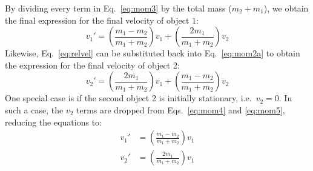 By dividing every term in Eq.~\ref{eq:mom3} by the total mass ($m_2+m_1$), we 
obtain the final expression for the final velocity of object $1$:
\begin{equation}
  \boxed{
    v_1'=
    \left(\frac{m_1-m_2}{m_1+m_2}\right)v_1 +
    \left(\frac{2m_1}{m_1+m_2}\right)v_2
  }
  \label{eq:mom4}
\end{equation}
Likewise, Eq.~\ref{eq:relvel} can be substituted back into Eq.~\ref{eq:mom2a}
to obtain the expression for the final velocity of object 2:
\begin{equation}
  \boxed{
    v_2'=
    \left(\frac{2m_1}{m_1+m_2}\right)v_1 +
    \left(\frac{m_1-m_2}{m_1+m_2}\right)v_2
  }
  \label{eq:mom5}
\end{equation}
One special case is if the second object 2 is initially stationary, i.e.\
$v_2=0$. In such a case, the $v_2$ terms are dropped from
Eqs.~\ref{eq:mom4} and \ref{eq:mom5}, reducing the equations to:
\begin{align}
  v_1'&=\left(\frac{m_1-m_2}{m_1+m_2}\right)v_1\\
  v_2'&=\left(\frac{2m_1}{m_1+m_2}\right)v_1
  \label{eg:simple1}
\end{align}



